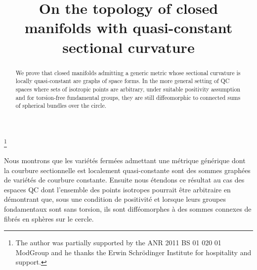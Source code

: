 \documentclass[JEP,XML,SOM,Unicode]{cedram}
\theoremstyle{definition}
\theoremstyle{remark}
\numberwithin{equation}{section}
\begin{document}
\frontmatter
\title[Topology of QC spaces]{On the topology of closed manifolds
with quasi-constant sectional curvature}
\author[\initial{L.} \lastname{Funar}]{ }
\address{Institut Fourier, Laboratoire de Mathématiques UMR 5582,
Université Grenoble Alpes\\
CS 40700, 38058 Grenoble, France}

\thanks{The author was partially supported by the ANR 2011 BS 01 020 01 ModGroup and he thanks the Erwin Schrödinger Institute for hospitality and support.}

\begin{abstract}
We prove that closed manifolds admitting a generic metric whose sectional curvature is locally quasi-constant are graphs of space forms. In the more general setting of QC spaces where sets of isotropic points are arbitrary, under suitable positivity assumption and for torsion-free fundamental groups, they are still diffeomorphic to connected sums of spherical bundles over the circle.
\end{abstract}





\begin{altabstract}
Nous montrons que les variétés fermées admettant une métrique générique dont la courbure sectionnelle est localement quasi-constante sont des sommes graphées de variétés de courbure constante. Ensuite nous étendons ce résultat au cas des espaces QC dont l'ensemble des points isotropes pourrait \^etre arbitraire en démontrant que, sous une condition de positivité et lorsque leurs groupes fondamentaux sont sans torsion, ils sont difféomorphes à des sommes connexes de fibrés en sphères sur le cercle.
\end{altabstract}
\maketitle
\vspace*{-\baselineskip}%
\tableofcontents
\vspace*{-2\baselineskip}%
\mainmatter
\end{document}
